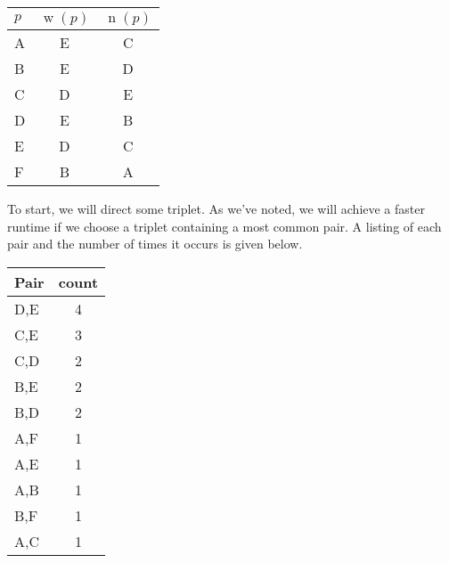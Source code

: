 \documentclass[12pt,x11names, rgb]{article}
\DeclareMathOperator{\w}{w}
\DeclareMathOperator{\n}{n}
\begin{document}
    \begin{center}
        \begin{tabular}{ l | c | c}
         $p$ & $\w(p)$ & $\n(p)$ \\
         \hline
          A &  E& C\\
          B &  E& D\\
          C &  D& E\\
          D &  E& B\\
          E &  D& C\\
          F &  B& A
        \end{tabular} %
    \end{center}
    \begin{comment}
        Assume E -> D
          E -> D is given, so player B's choices give B -> D
          E -> D is given, so player B's choices give B -> E
          E -> D is given, so player C's choices give E -> C
          E -> D is given, so player C's choices give D -> C
          E -> D is given, so player D's choices give B -> D
          E -> D is given, so player D's choices give B -> E
          E -> D is given, so player E's choices give E -> C
          E -> D is given, so player E's choices give D -> C
          D -> C is given, so player C's choices give E -> C
          D -> C is given, so player C's choices give E -> D
          D -> C is given, so player E's choices give E -> C
          D -> C is given, so player E's choices give E -> D
          E -> C is given, so player A's choices give A -> C
          E -> C is given, so player A's choices give A -> E
          E -> C is given, so player E's choices give D -> C
          E -> C is given, so player E's choices give E -> D
          D -> C is given, so player E's choices give E -> C
          D -> C is given, so player E's choices give E -> D
          Assume F -> B
            F -> B is given, so player F's choices give F -> A
            F -> B is given, so player F's choices give B -> A
            No more players to try, and G is acyclic: Success!
         F B A E D C
    \end{comment}
    To start, we will direct some triplet. As we've noted, we will achieve a faster runtime if we choose a triplet containing a most common pair. A listing of each pair and the number of times it occurs is given below.
    \begin{center}
    \begin{tabular}{l | c}
        Pair & count \\
        \hline
        D,E & 4 \\
        C,E & 3 \\
        C,D & 2 \\
        B,E & 2 \\
        B,D & 2 \\
        A,F & 1 \\
        A,E & 1 \\
        A,B & 1 \\
        B,F & 1 \\
        A,C & 1 
    \end{tabular}
    \end{center}
\end{document}

